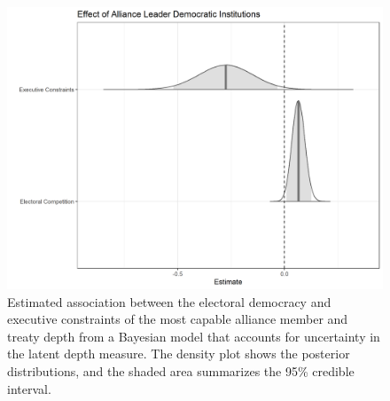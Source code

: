 \documentclass[12pt]{article}
\begin{document}
\begin{figure}
\includegraphics[width=.95\textwidth]{results-unc-depth.png}  
\caption{Estimated association between the electoral democracy and executive constraints of the most capable alliance member and treaty depth from a Bayesian model that accounts for uncertainty in the latent depth measure. The density plot shows the posterior distributions, and the shaded area summarizes the 95\% credible interval.}
\label{fig:results-unc-depth}
\end{figure}




\newpage

\singlespace
 
 
\end{document}
